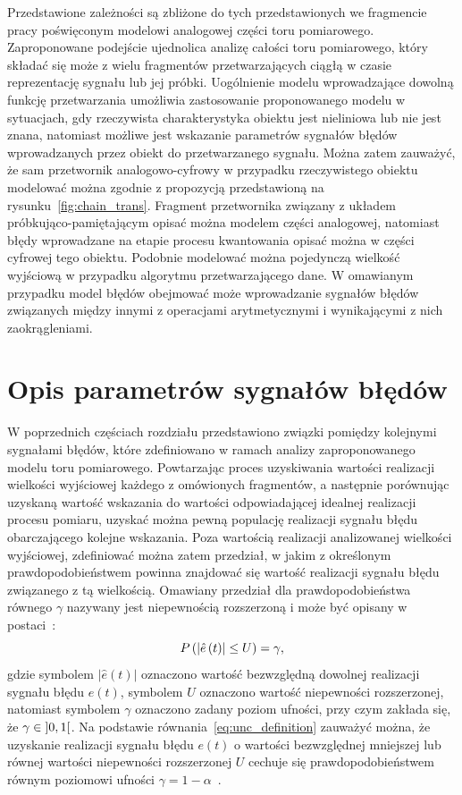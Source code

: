 Przedstawione zależności są zbliżone do tych przedstawionych we fragmencie pracy poświęconym modelowi analogowej części toru pomiarowego. Zaproponowane podejście ujednolica analizę całości toru pomiarowego, który składać się może z wielu fragmentów przetwarzających ciągłą w czasie reprezentację sygnału lub jej próbki. Uogólnienie modelu wprowadzające dowolną funkcję przetwarzania umożliwia zastosowanie proponowanego modelu w sytuacjach, gdy rzeczywista charakterystyka obiektu jest nieliniowa lub nie jest znana, natomiast możliwe jest wskazanie parametrów sygnałów błędów wprowadzanych przez obiekt do przetwarzanego sygnału. Można zatem zauważyć, że sam przetwornik analogowo-cyfrowy w przypadku rzeczywistego obiektu modelować można zgodnie z propozycją przedstawioną na rysunku~\ref{fig:chain_trans}. Fragment przetwornika związany z układem próbkująco-pamiętającym opisać można modelem części analogowej, natomiast błędy wprowadzane na etapie procesu kwantowania opisać można w części cyfrowej tego obiektu. Podobnie modelować można pojedynczą wielkość wyjściową w przypadku algorytmu przetwarzającego dane. W omawianym przypadku model błędów obejmować może wprowadzanie sygnałów błędów związanych między innymi z operacjami arytmetycznymi i wynikającymi z nich zaokrągleniami.

\section{Opis parametrów sygnałów błędów}

W poprzednich częściach rozdziału przedstawiono związki pomiędzy kolejnymi sygnałami błędów, które zdefiniowano w ramach analizy zaproponowanego modelu toru pomiarowego. Powtarzając proces uzyskiwania wartości realizacji wielkości wyjściowej każdego z omówionych fragmentów, a następnie porównując uzyskaną wartość wskazania do wartości odpowiadającej idealnej realizacji procesu pomiaru, uzyskać można pewną populację realizacji sygnału błędu obarczającego kolejne wskazania. Poza wartością realizacji analizowanej wielkości wyjściowej, zdefiniować można zatem przedział, w jakim z określonym prawdopodobieństwem powinna znajdować się wartość realizacji sygnału błędu związanego z tą wielkością. Omawiany przedział dla prawdopodobieństwa równego $\gamma$ nazywany jest niepewnością rozszerzoną i może być opisany w postaci~\cite{jcgm_guide}:
\begin{equation}
P \left(\left|\hat{e} \left(t\right)\right| \le U\right) = \gamma \label{eq:unc_definition},
\end{equation}
gdzie symbolem $|\hat{e}(t)|$ oznaczono wartość bezwzględną dowolnej realizacji sygnału błędu $e(t)$, symbolem $U$ oznaczono wartość niepewności rozszerzonej, natomiast symbolem $\gamma$ oznaczono zadany poziom ufności, przy czym zakłada się, że $\gamma \in \ointerval{0}{1}$. Na podstawie równania~\eqref{eq:unc_definition} zauważyć można, że uzyskanie realizacji sygnału błędu $e(t)$ o wartości bezwzględnej mniejszej lub równej wartości niepewności rozszerzonej $U$ cechuje się prawdopodobieństwem równym poziomowi ufności $\gamma = 1 - \alpha$~\cite{jcgm_guide}.

